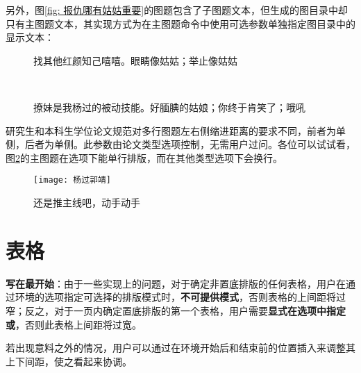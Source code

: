 \documentclass[print, doctor, vlined]{DissertUESTC}
\begin{document}
	另外，图\ref{fig: 报仇哪有姑姑重要}的图题包含了子图题文本，但生成的图目录中却只有主图题文本，其实现方式为在主图题命令中使用可选参数单独指定图目录中的显示文本：
	
	\begin{figure}[!htb]
		\centering
		\hfill
		\subfloat[]{
			\texttt{[image: 程英3]}
			\label{fig: 程英3}
		}
		\caption{找其他红颜知己嘻嘻。眼睛像姑姑；举止像姑姑} \label{fig: 红颜知己}
	\end{figure}
	
	\begin{figure}[!htb]
		\centering
		\subfloat[]{
			\texttt{[image: 绿萼2]}
			\label{fig: 绿萼2}
		}
		\hfill
		\\
		\caption{撩妹是我杨过的被动技能。好腼腆的姑娘；你终于肯笑了；哦吼} \label{fig: 被动技能}
	\end{figure}

	研究生和本科生学位论文规范对多行图题左右侧缩进距离的要求不同，前者为单侧\shad{4em}，后者为单侧\shad{2em}。此参数由论文类型选项控制，无需用户过问。各位可以试试看，图\ref{fig: 被动技能}的主图题在选项下能单行排版，而在其他类型选项下会换行。
	
	\begin{figure}[!htb]
		\centering
		\texttt{[image: 杨过郭靖]}
		\caption{还是推主线吧，动手动手}
	\end{figure}
	
	\clearpage
	\section{表格}

	\textbf{写在最开始}：由于一些实现上的问题，对于确定非置底排版的任何表格，用户在通过环境的选项指定可选择的排版模式时，\textbf{不可提供模式}，否则表格的上间距将过窄；反之，对于一页内确定置底排版的第一个表格，用户需要\textbf{显式在选项中指定或}，否则此表格上间距将过宽。

	若出现意料之外的情况，用户可以通过在环境开始后和结束前的位置插入来调整其上下间距，使之看起来协调。
	
\end{document}
